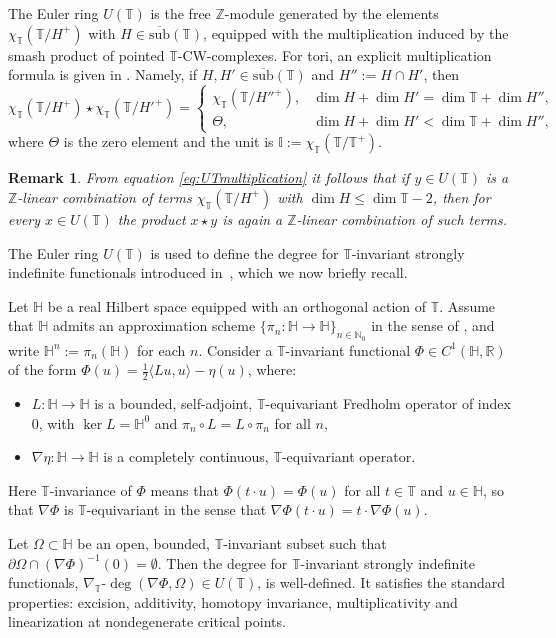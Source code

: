 \documentclass[reqno,twoside,12pt]{amsart}
\newtheorem{Remark}{Remark}[section]
\newcommand{\bH}{\mathbb{H}}
\newcommand{\bI}{\mathbb{I}}
\newcommand{\bN}{\mathbb{N}}
\newcommand{\bR}{\mathbb{R}}
\newcommand{\bT}{\mathbb{T}}
\newcommand{\bZ}{\mathbb{Z}}
\numberwithin{equation}{section} \errorcontextlines=0
\newcommand{\sub}{\overline{\mathrm{sub}}}
\begin{document}
The Euler ring $U(\bT)$ is the free $\bZ$-module generated by the elements $\chi_\bT(\bT/H^+)$ with $H\in\sub(\bT)$, equipped with the multiplication induced by the smash product of pointed $\bT$-CW-complexes.
For tori, an explicit multiplication formula is given in \cite{GarRyb}. Namely, if $H,H'\in\sub(\bT)$ and $H'':=H\cap H'$, then
\begin{equation}\label{eq:UTmultiplication}
\chi_\bT(\bT/H^+)\star\chi_\bT(\bT/H'^+)=
\begin{cases}
\chi_\bT(\bT/H''^+), & \dim H+\dim H'=\dim\bT+\dim H'',\\
\Theta, & \dim H+\dim H'<\dim\bT+\dim H'',
\end{cases}
\end{equation}
where $\Theta$ is the zero element and the unit is $\bI:=\chi_\bT(\bT/\bT^+)$.

\begin{Remark}\label{rem:bigcodim} From equation \eqref{eq:UTmultiplication} it follows that if $y\in U(\bT)$ is a $\bZ$-linear combination of terms $\chi_\bT(\bT/H^+)$ with $\dim H\le \dim\bT-2$, then for every $x\in U(\bT)$ the product $x\star y$ is again a $\bZ$-linear combination of such terms.
\end{Remark}

The Euler ring $U(\bT)$ is used to define the degree for $\bT$-invariant strongly indefinite functionals introduced in~\cite{GolRyb}, which we now briefly recall.

Let $\bH$ be a real Hilbert space equipped with an orthogonal action of $\bT$. Assume that $\bH$ admits an approximation scheme $\{\pi_n:\bH\to\bH\}_{n\in\bN_0}$ in the sense of \cite{GolRyb}, and write $\bH^n:=\pi_n(\bH)$ for each $n$. Consider a $\bT$-invariant functional $\Phi\in C^1(\bH,\bR)$ of the form $\Phi(u)=\tfrac12\langle Lu,u\rangle-\eta(u)$, where:
\begin{itemize}
\item $L:\bH\to\bH$ is a bounded, self-adjoint, $\bT$-equivariant Fredholm operator of index $0$, with $\ker L=\bH^0$ and $\pi_n\circ L=L\circ\pi_n$ for all $n$,
\item $\nabla\eta:\bH\to\bH$ is a completely continuous, $\bT$-equivariant operator.
\end{itemize}
Here $\bT$-invariance of $\Phi$ means that $\Phi(t\cdot u)=\Phi(u)$ for all $t\in\bT$ and $u\in\bH$, so that $\nabla\Phi$ is $\bT$-equivariant in the sense that $\nabla\Phi(t\cdot u)=t\cdot\nabla\Phi(u)$.

Let $\Omega\subset\bH$ be an open, bounded, $\bT$-invariant subset such that $\partial\Omega\cap(\nabla\Phi)^{-1}(0)=\emptyset$. Then the degree for $\bT$-invariant strongly indefinite functionals, $\nabla_\bT\text{-}\deg(\nabla\Phi,\Omega)\in U(\bT)$, is well-defined. It satisfies the standard properties: excision, additivity, homotopy invariance, multiplicativity and linearization at nondegenerate critical points.
\end{document}
